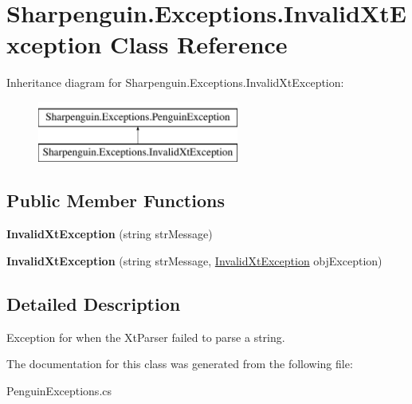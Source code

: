 \hypertarget{classSharpenguin_1_1Exceptions_1_1InvalidXtException}{\section{Sharpenguin.\-Exceptions.\-Invalid\-Xt\-Exception Class Reference}
\label{classSharpenguin_1_1Exceptions_1_1InvalidXtException}
}
Inheritance diagram for Sharpenguin.\-Exceptions.\-Invalid\-Xt\-Exception\-:\begin{figure}[H]
\begin{center}
\leavevmode
\includegraphics[height=2.000000cm]{classSharpenguin_1_1Exceptions_1_1InvalidXtException}
\end{center}
\end{figure}
\subsection*{Public Member Functions}
\begin{DoxyCompactItemize}
\item 
\hypertarget{classSharpenguin_1_1Exceptions_1_1InvalidXtException_ae678819fe4f70d0490f04615248f4ce4}{{\bfseries Invalid\-Xt\-Exception} (string str\-Message)}\label{classSharpenguin_1_1Exceptions_1_1InvalidXtException_ae678819fe4f70d0490f04615248f4ce4}

\item 
\hypertarget{classSharpenguin_1_1Exceptions_1_1InvalidXtException_ac47819418564a31ee3ccc146639c19e0}{{\bfseries Invalid\-Xt\-Exception} (string str\-Message, \hyperlink{classSharpenguin_1_1Exceptions_1_1InvalidXtException}{Invalid\-Xt\-Exception} obj\-Exception)}\label{classSharpenguin_1_1Exceptions_1_1InvalidXtException_ac47819418564a31ee3ccc146639c19e0}

\end{DoxyCompactItemize}


\subsection{Detailed Description}
Exception for when the Xt\-Parser failed to parse a string. 

The documentation for this class was generated from the following file\-:\begin{DoxyCompactItemize}
\item 
Penguin\-Exceptions.\-cs\end{DoxyCompactItemize}
